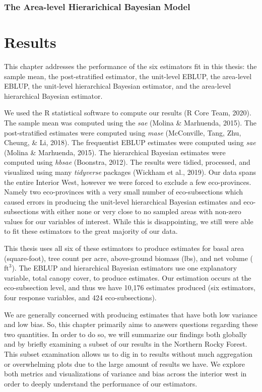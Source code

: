 \documentclass[12pt,twoside]{reedthesis}
\begin{document}
\hypertarget{the-area-level-hierarichical-bayesian-model}{%
\subsection{The Area-level Hierarichical Bayesian Model}\label{the-area-level-hierarichical-bayesian-model}}

\hypertarget{results}{%
\chapter{Results}\label{results}}

This chapter addresses the performance of the six estimators fit in this thesis: the sample mean, the post-stratified estimator, the unit-level EBLUP, the area-level EBLUP, the unit-level hierarchical Bayesian estimator, and the area-level hierarchical Bayesian estimator.

We used the R statistical software to compute our results (R Core Team, 2020). The sample mean was computed using the \emph{sae} (Molina \& Marhuenda, 2015). The post-stratified estimates were computed using \emph{mase} (McConville, Tang, Zhu, Cheung, \& Li, 2018). The frequentist EBLUP estimates were computed using \emph{sae} (Molina \& Marhuenda, 2015). The hierarchical Bayesian estimates were computed using \emph{hbsae} (Boonstra, 2012). The results were tidied, processed, and visualized using many \emph{tidyverse} packages (Wickham et al., 2019). Our data spans the entire Interior West, however we were forced to exclude a few eco-provinces. Namely two eco-provinces with a very small number of eco-subsections which caused errors in producing the unit-level hierarchical Bayesian estimates and eco-subsections with either none or very close to no sampled areas with non-zero values for our variables of interest. While this is disappointing, we still were able to fit these estimators to the great majority of our data.

This thesis uses all six of these estimators to produce estimates for basal area (square-foot), tree count per acre, above-ground biomass (lbs), and net volume (\(\text{ft}^3\)). The EBLUP and hierarchical Bayesian estimators use one explanatory variable, total canopy cover, to produce estimates. Our estimation occurs at the eco-subsection level, and thus we have 10,176 estimates produced (six estimators, four response variables, and 424 eco-subsections).

We are generally concerned with producing estimates that have both low variance and low bias. So, this chapter primarily aims to answers questions regarding these two quantities. In order to do so, we will summarize our findings both globally and by briefly examining a subset of our results in the Northern Rocky Forest. This subset examination allows us to dig in to results without much aggregation or overwhelming plots due to the large amount of results we have. We explore both metrics and visualizations of variance and bias across the interior west in order to deeply understand the performance of our estimators.
\end{document}
